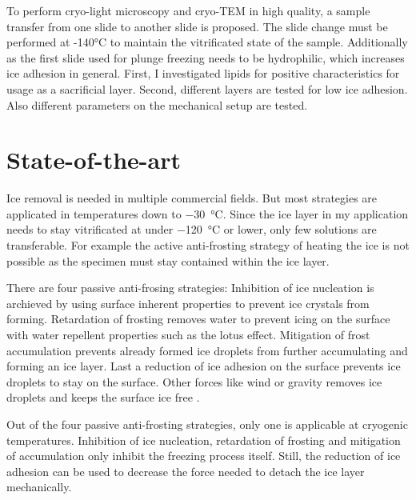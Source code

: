 To perform cryo-light microscopy and cryo-TEM in high quality, a sample transfer from one slide to another slide is proposed. The slide change must be performed at -140°C to maintain the vitrificated state of the sample. Additionally as the first slide used for plunge freezing needs to be hydrophilic, which increases ice adhesion in general. First, I investigated lipids for positive characteristics for usage as a sacrificial layer. Second, different layers are tested for low ice adhesion. Also different parameters on the mechanical setup are tested.

\section{State-of-the-art}

Ice removal is needed in multiple commercial fields. But most strategies are applicated in temperatures down to \SI{-30}{\degreeCelsius}. Since the ice layer in my application needs to stay vitrificated at under \SI{-120}{\degreeCelsius} or lower, only few solutions are transferable. For example the active anti-frosting strategy of heating the ice is not possible as the specimen must stay contained within the ice layer.


There are four passive anti-frosing strategies: Inhibition of ice nucleation is archieved by using surface inherent properties to prevent ice crystals from forming. Retardation of frosting removes water to prevent icing on the surface with water repellent properties such as the lotus effect. Mitigation of frost accumulation prevents already formed ice droplets from further accumulating and forming an ice layer. Last a reduction of ice adhesion on the surface prevents ice droplets to stay on the surface. Other forces like wind or gravity removes ice droplets and keeps the surface ice free \cite{Yang.2021}. 

Out of the four passive anti-frosting strategies, only one is applicable at cryogenic temperatures. Inhibition of ice nucleation, retardation of frosting and mitigation of accumulation only inhibit the freezing process itself. Still, the reduction of ice adhesion can be used to decrease the force needed to detach the ice layer mechanically. 

